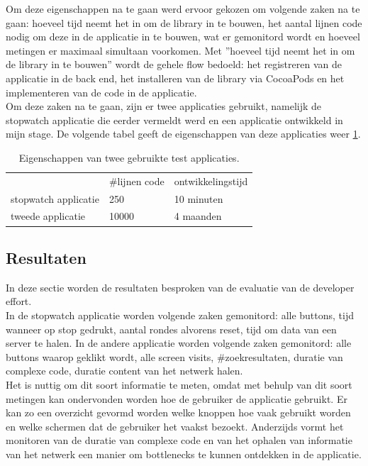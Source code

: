 Om deze eigenschappen na te gaan werd ervoor gekozen om volgende zaken na te gaan: hoeveel tijd neemt het in om de library in te bouwen, het aantal lijnen code nodig om deze in de applicatie in te bouwen, wat er gemonitord wordt en hoeveel metingen er maximaal simultaan voorkomen. Met ''hoeveel tijd neemt het in om de library in te bouwen''  wordt de gehele flow bedoeld: het registreren van de applicatie in de back end, het installeren van de library via CocoaPods en het implementeren van de code in de applicatie. \\

Om deze zaken na te gaan, zijn er twee applicaties gebruikt, namelijk de stopwatch applicatie die eerder vermeldt werd en een applicatie ontwikkeld in mijn stage. De volgende tabel geeft de eigenschappen van deze applicaties weer \ref{table:apps}.

\begin{table}[h]
\centering
\label{table:apps}
\begin{tabular}{lll}
                     & \#lijnen code & ontwikkelingstijd \\
stopwatch applicatie & 250           & 10 minuten        \\
tweede applicatie    & 10000         & 4 maanden        
\end{tabular}
\caption{Eigenschappen van twee gebruikte test applicaties.}
\end{table}

\subsection{Resultaten}
In deze sectie worden de resultaten besproken van de evaluatie van de developer effort.\\
In de stopwatch applicatie worden volgende zaken gemonitord: alle buttons, tijd wanneer op stop gedrukt, aantal rondes alvorens reset, tijd om data van een server te halen. In de andere applicatie worden volgende zaken gemonitord: alle buttons waarop geklikt wordt, alle screen visits, \#zoekresultaten, duratie van complexe code, duratie content van het netwerk halen.\\

Het is nuttig om dit soort informatie te meten, omdat met behulp van dit soort metingen kan ondervonden worden hoe de gebruiker de applicatie gebruikt. Er kan zo een overzicht gevormd worden welke knoppen hoe vaak gebruikt worden en welke schermen dat de gebruiker het vaakst bezoekt. Anderzijds vormt het monitoren van de duratie van complexe code en van het ophalen van informatie van het netwerk een manier om bottlenecks te kunnen ontdekken in de applicatie. \\

